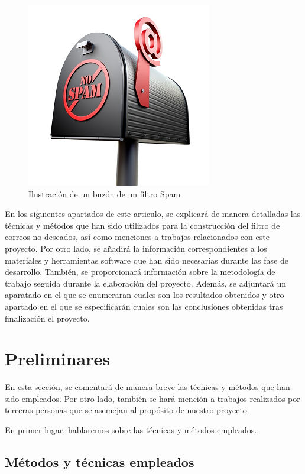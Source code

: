 \documentclass[conference,a4paper]{IEEEtran}
\begin{document}
\begin{figure}
  \centering
  \includegraphics{spam}
  \caption{Ilustración de un buzón de un filtro Spam}
  \label{fig:spam}
\end{figure}


En los siguientes apartados de este articulo, se explicará de manera detalladas las técnicas y métodos que han sido utilizados para la construcción del filtro de correos no deseados, así como menciones a trabajos relacionados con este proyecto. Por otro lado, se añadirá la información correspondientes a los materiales y herramientas software que han sido necesarias durante las fase de desarrollo. También, se proporcionará información sobre la metodología de trabajo seguida durante la elaboración del proyecto. Además, se adjuntará  un aparatado en el que se enumeraran cuales son los resultados obtenidos y otro apartado en el que se especificarán cuales son las conclusiones obtenidas tras finalización el proyecto.



\section{Preliminares}

En esta sección, se comentará de manera breve las técnicas y métodos que han sido empleados. Por otro lado, también se hará mención a trabajos realizados por terceras personas que se asemejan al propósito de nuestro proyecto. 

En primer lugar, hablaremos sobre las técnicas y métodos empleados.


\subsection{Métodos y técnicas empleados}
\end{document}
